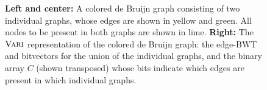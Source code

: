 \begin{figure}
\centering
\label{fig:lime}
\caption{ {\bf Left and center:} A colored de Bruijn graph consisting of two individual graphs, whose edges are shown in yellow and green. All nodes to be present in both graphs are shown in lime.  {\bf Right:} The $\mbox{\rm {\sc Vari}}$ representation of the colored de Bruijn graph: the edge-BWT and bitvectors for the union of the individual graphs, and the binary array $C$ (shown transposed) whose bits indicate which edges are present in which individual graphs.} %

\end{figure}



